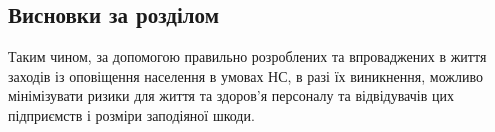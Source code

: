 \newpage

\subsection{Висновки за розділом}

Таким чином, за допомогою правильно розроблених та впроваджених в життя заходів із оповіщення населення в умовах НС, в разі їх виникнення, можливо мінімізувати ризики для життя та здоров’я персоналу та відвідувачів цих підприємств і розміри заподіяної шкоди. 
